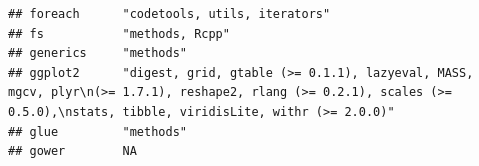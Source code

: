 \documentclass[]{article}
\begin{document}
\begin{verbatim}
## foreach      "codetools, utils, iterators"                                                                                                                                                                                                                                                                                                                                                                                                                                                         
## fs           "methods, Rcpp"                                                                                                                                                                                                                                                                                                                                                                                                                                                                       
## generics     "methods"                                                                                                                                                                                                                                                                                                                                                                                                                                                                             
## ggplot2      "digest, grid, gtable (>= 0.1.1), lazyeval, MASS, mgcv, plyr\n(>= 1.7.1), reshape2, rlang (>= 0.2.1), scales (>= 0.5.0),\nstats, tibble, viridisLite, withr (>= 2.0.0)"                                                                                                                                                                                                                                                                                                               
## glue         "methods"                                                                                                                                                                                                                                                                                                                                                                                                                                                                             
## gower        NA                                                                                                                                                                                                                                                                                                                                                                                                                                                                                    

\end{verbatim}
\end{document}
